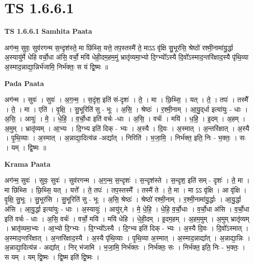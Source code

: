 \documentclass[17pt]{extarticle}
\begin{document}
\section*{ TS 1.6.6.1 }

\textbf{TS 1.6.6.1 } \newline
\textbf{Samhita Paata} \newline

अग॑न्म॒ सुवः॒ सुव॑रगन्म स॒न्दृश॑स्ते॒ मा छि॑थ्सि॒ यत्ते॒ तप॒स्तस्मै॑ ते॒ माऽऽ वृ॑क्षि सु॒भूर॑सि॒ श्रेष्ठो॑ रश्मी॒नामा॑यु॒र्द्धा अ॒स्यायु॑र्मे धेहि वर्चो॒धा अ॑सि॒ वर्चो॒ मयि॑ धेही॒दम॒हम॒मुं भ्रातृ॑व्यमा॒भ्यो दि॒ग्भ्यो᳚ऽस्यै दि॒वो᳚ऽस्माद॒न्तरि॑क्षाद॒स्यै पृ॑थि॒व्या अ॒स्माद॒न्नाद्या॒न्निर्भ॑जामि॒ निर्भ॑क्तः॒ स यं द्वि॒ष्मः ॥ \newline

\textbf{Pada Paata} \newline

अग॑न्म । सुवः॑ । सुवः॑ । अ॒ग॒न्म॒ । स॒दृंश॒ इति॑ सं-दृशः॑ । ते॒ । मा । छि॒थ्सि॒ । यत् । ते॒ । तपः॑ । तस्मै᳚ । ते॒ । मा । एति॑ । वृ॒क्षि॒ । सु॒भूरिति॑ सु - भूः । अ॒सि॒ । श्रेष्ठः॑ । र॒श्मी॒नाम् । आ॒यु॒द्‌र्धा इत्या॑युः - धाः । अ॒सि॒ । आयुः॑ । मे॒ । धे॒हि॒ । व॒र्चो॒धा इति॑ वर्चः -धाः । अ॒सि॒ । वर्चः॑ । मयि॑ । ध॒हि॒ । इ॒दम् । अ॒हम् । अ॒मुम् । भ्रातृ॑व्यम् । आ॒भ्यः । दि॒ग्भ्य इति॑ दिक् - भ्यः । अ॒स्यै । दि॒वः । अ॒स्मात् । अ॒न्तरि॑क्षात् । अ॒स्यै । पृ॒थि॒व्याः । अ॒स्मात् । अ॒न्नाद्या॒दित्य॑न्न -अद्या᳚त् । निरिति॑ । भ॒जा॒मि॒ । निर्भ॑क्त॒ इति॒ निः - भ॒क्तः॒ । सः । यम् । द्वि॒ष्मः ॥  \newline


\textbf{Krama Paata} \newline

अग॑न्म॒ सुवः॑ । सुवः॒ सुवः॑ । सुव॑रगन्म । अ॒ग॒न्म॒ स॒न्दृशः॑ । स॒न्दृश॑स्ते । स॒न्दृश॒ इति॑ सम् - दृशः॑ । ते॒ मा । मा छि॑थ्सि । छि॒थ्सि॒ यत् । यत्ते᳚ । ते॒ तपः॑ । तप॒स्तस्मै᳚ । तस्मै॑ ते । ते॒ मा । मा ऽऽ वृ॑क्षि । आ वृ॑क्षि । वृ॒क्षि॒ सु॒भूः । सु॒भूर॑सि । सु॒भूरिति॑ सु - भूः । अ॒सि॒ श्रेष्ठः॑ । श्रेष्ठो॑ रश्मी॒नाम् । र॒श्मी॒नामा॑यु॒र्द्धाः । आ॒यु॒र्द्धा अ॑सि । आ॒यु॒र्द्धा इत्या॑युः - धाः । अ॒स्यायुः॑ । आयु॑र्,मे । मे॒ धे॒हि॒ । धे॒हि॒ व॒र्चो॒धाः । व॒र्चो॒धा अ॑सि । व॒र्चो॒धा इति॑ वर्चः - धाः । अ॒सि॒ वर्चः॑ । वर्चो॒ मयि॑ । मयि॑ धेहि । धे॒ही॒दम् । इ॒दम॒हम् । अ॒हम॒मुम् । अ॒मुम् भ्रातृ॑व्यम् । भ्रातृ॑व्यमा॒भ्यः । आ॒भ्यो दि॒ग्भ्यः । दि॒ग्भ्यो᳚ऽस्यै । दि॒ग्भ्य इति॑ दिक् - भ्यः । अ॒स्यै दि॒वः । दि॒वो᳚ऽस्मात् । अ॒स्माद॒न्तरि॑क्षात् । अ॒न्तरि॑क्षाद॒स्यै । अ॒स्यै पृ॑थि॒व्याः । पृ॒थि॒व्या अ॒स्मात् । अ॒स्माद॒न्नाद्या᳚त् । अ॒न्नाद्या॒न्निः । अ॒न्नाद्या॒दित्य॑न्न - अद्या᳚त् । निर् भ॑जामि । भ॒जा॒मि॒ निर्भ॑क्तः । निर्भ॑क्तः॒ सः । निर्भ॑क्त॒ इति॒ निः - भ॒क्तः॒ । स यम् । यम् द्वि॒ष्मः । द्वि॒ष्म इति॑ द्वि॒ष्मः । \newline
\end{document}
